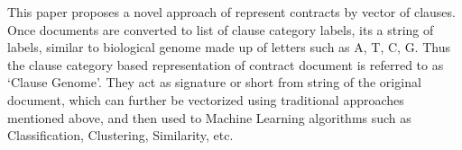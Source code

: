 \documentclass[9pt,academicons]{article}
\begin{document}
This paper proposes a novel approach of represent contracts by vector of clauses.
Once documents are converted to list of clause category labels, its a string of labels, similar to biological genome made up of letters such as A, T, C, G. Thus the clause category based representation of contract document is referred to as `Clause Genome'.  They act as signature or short from string of the original document, which can further be vectorized using traditional approaches mentioned above, and then used to Machine Learning algorithms such as Classification, Clustering, Similarity, etc.






\end{document}
